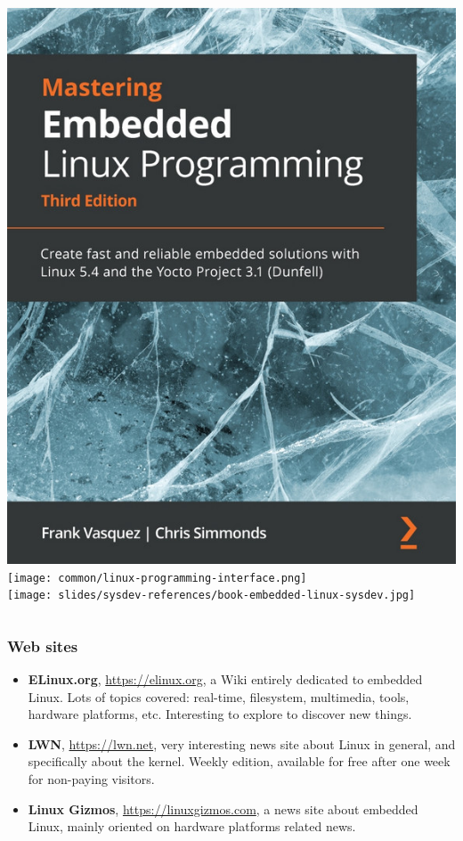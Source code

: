 \begin{frame}
\begin{columns}
    \includegraphics[height=0.25\textheight]{slides/sysdev-references/book-mastering-embedded-linux3.jpg}\\
    \vspace{0.5cm}
    \texttt{[image: common/linux-programming-interface.png]}\\
    \vspace{0.5cm}
    \texttt{[image: slides/sysdev-references/book-embedded-linux-sysdev.jpg]}\\
  \end{columns}
\end{frame}

\begin{frame}
  \frametitle{Web sites}
  \begin{itemize}
  \item {\bf ELinux.org}, \url{https://elinux.org}, a Wiki entirely
    dedicated to embedded Linux. Lots of topics covered: real-time,
    filesystem, multimedia, tools, hardware platforms,
    etc. Interesting to explore to discover new things.
  \item {\bf LWN}, \url{https://lwn.net}, very interesting news site
    about Linux in general, and specifically about the kernel. Weekly
    edition, available for free after one week for non-paying
    visitors.
  \item {\bf Linux Gizmos}, \url{https://linuxgizmos.com}, a news site
    about embedded Linux, mainly oriented on hardware platforms
    related news.
  \end{itemize}
\end{frame}

